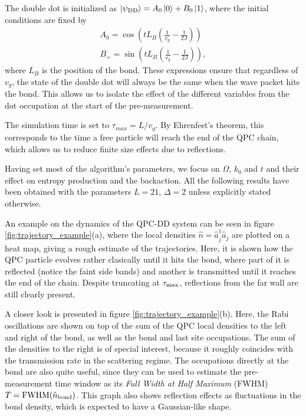 \documentclass{article}
\begin{document}
The double dot is initialized
as $\ket{\psi_{\rm DD}} = A_0 \ket{0} + B_0 \ket{1}$,
where the initial conditions are fixed by 
\begin{align}
    A_0 = \cos\left( t L_B \left(\frac{1}{v_g} - \frac{1}{2J}\right) \right) \\
    B_= = \sin\left( t L_B \left(\frac{1}{v_g} - \frac{1}{2J}\right) \right),
\end{align}
where $L_B$ is the position of the bond. These expressions ensure that regardless of $v_g$, the 
state of the double dot will always be the same when the wave packet hits the bond. This allows 
us to isolate the effect of the different variables from the dot occupation at the start
of the pre-measurement.

The simulation time is set to $\tau_{max}=L/v_g$. By Ehrenfest's theorem, this corresponds 
to the time a free particle will reach the end of the QPC chain, which allows us to reduce finite
size effects due to reflections.

Having set most of the algorithm's parameters, we focus on $\Omega$, $k_0$ and $t$ and their effect
on entropy production and the backaction. All the following results have been obtained with the parameters $L=21$, $\Delta=2$ unless 
explicitly stated otherwise.

An example on the dynamics of the QPC-DD system can be seen in figure \ref{fig:trajectory_example}(a),
where the local densities $\hat{n} = \hat{a}_j^\dagger\hat{a}_j$ are plotted on a heat map,
giving a rough estimate of the trajectories. Here, it is shown how the QPC particle evolves
rather clasically until it hits the bond, where part of it is reflected (notice the faint 
side bands) and another is transmitted until it reaches the end of the chain. Despite truncating
at $\tau_{\rm max}$, reflections from the far wall are still clearly present. 

A closer look is 
presented in figure \ref{fig:trajectory_example}(b). Here, the Rabi oscillations are shown on top
of the sum of the QPC local densities to the left and right of the bond, as well as the bond and 
last site occupations. The sum of the densities to the right is of special interest, because it 
roughly coincides with the transmission rate in the scattering regime. The occupations directly 
at the bond are also quite useful, since they can be used to estimate the pre-measurement time window
as its \textit{Full Width at Half Maximum} (FWHM) $T = \text{FWHM}(\hat{n}_{\rm bond})$. This
graph also shows reflection effects as fluctuations in the bond density, which is expected to 
have a Gaussian-like shape.
\end{document}
